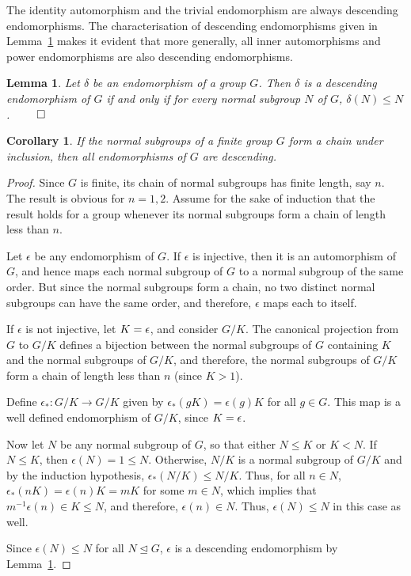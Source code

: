 \documentclass[11pt, a4paper]{article}
\let\ker\relax
\newtheorem{Lemma}[Theorem]{Lemma}
\newtheorem{Corollary}[Theorem]{Corollary}
\theoremstyle{definition}
\begin{document}
The identity automorphism and the trivial endomorphism are always descending endomorphisms. The characterisation of descending endomorphisms given in Lemma~\ref{lem:DescEnd=NormInv} makes it evident that more generally, all inner automorphisms and power endomorphisms are also descending endomorphisms.

\begin{Lemma}\label{lem:DescEnd=NormInv}
Let $\delta$ be an endomorphism of a group $G$. Then $\delta$ is a descending endomorphism of $G$ if and only if for every normal subgroup $N$ of $G$, $\delta(N) \le N$. $\qed$
\end{Lemma}

\begin{Corollary}
If the normal subgroups of a finite group $G$ form a chain under inclusion, then all endomorphisms of $G$ are descending.
\end{Corollary}
\begin{proof}
Since $G$ is finite, its chain of normal subgroups has finite length, say $n$. The result is obvious for $n = 1, 2$. Assume for the sake of induction that the result holds for a group whenever its normal subgroups form a chain of length less than $n$.

Let $\epsilon$ be any endomorphism of $G$. If $\epsilon$ is injective, then it is an automorphism of $G$, and hence maps each normal subgroup of $G$ to a normal subgroup of the same order. But since the normal subgroups form a chain, no two distinct normal subgroups can have the same order, and therefore, $\epsilon$ maps each to itself.

If $\epsilon$ is not injective, let $K = \ker \epsilon$, and consider $G/K$. The canonical projection from $G$ to $G/K$ defines a bijection between the normal subgroups of $G$ containing $K$ and the normal subgroups of $G/K$, and therefore, the normal subgroups of $G/K$ form a chain of length less than $n$ (since $K > 1$).

Define $\epsilon_*\colon G/K \to G/K$ given by $\epsilon_*(gK) = \epsilon(g)K$ for all $g \in G$. This map is a well defined endomorphism of $G/K$, since $K = \ker \epsilon$.

Now let $N$ be any normal subgroup of $G$, so that either $N \le K$ or $K < N$. If $N \le K$, then $\epsilon(N) = 1 \le N$. Otherwise, $N/K$ is a normal subgroup of $G/K$ and by the induction hypothesis, $\epsilon_*(N/K) \le N/K$. Thus, for all $n \in N$, $\epsilon_*(nK) = \epsilon(n)K = mK$ for some $m \in N$, which implies that $m^{-1}\epsilon(n) \in K \le N$, and therefore, $\epsilon(n) \in N$. Thus, $\epsilon(N) \le N$ in this case as well.

Since $\epsilon(N) \le N$ for all $N \unlhd G$, $\epsilon$ is a descending endomorphism by Lemma~\ref{lem:DescEnd=NormInv}.
\end{proof}
\end{document}
